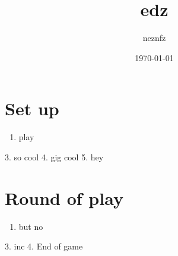 \documentclass{article}%
\title{edz}%
\author{neznfz}%
\date{\today}%
\begin{document}
%
\pagestyle{empty}%
\normalsize%
\maketitle%
\section{ Set up
}%
\label{sec:Setup}%
\begin{enumerate}%
\item%
 play
%
\end{enumerate}%
3. so cool
%
4. gig cool
%
5. hey


%
\section{ Round of play
}%
\label{sec:Roundofplay}%
\begin{enumerate}%
\item%
 but no
%
\end{enumerate}%
3. inc
%
4. End of game

%
\end{document}
